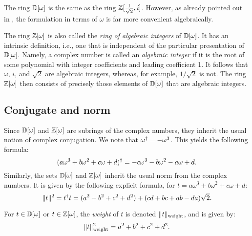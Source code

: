 \begin{remark}
  The ring $\mathbb{D}[\omega]$ is the same as the ring $\mathbb{Z}[\frac1{\sqrt{2}},i]$. However, as already pointed out
  in {\cite{Kliuchnikov-et-al}}, the formulation in terms of $\omega$ is far more convenient
  algebraically.
\end{remark}

\begin{remark}
  The ring $\mathbb{Z}[\omega]$ is also called the {\em ring of algebraic integers} of $\mathbb{D}[\omega]$. It has an intrinsic
  definition, i.e., one that is independent of the particular presentation of $\mathbb{D}[\omega]$. Namely, a
  complex number is called an {\em algebraic integer} if it is the root of some polynomial with
  integer coefficients and leading coefficient 1. It follows that $\omega$, $i$, and $\sqrt{2}$ are
  algebraic integers, whereas, for example, $1/\sqrt{2}$ is not. The ring $\mathbb{Z}[\omega]$ then consists of
  precisely those elements of $\mathbb{D}[\omega]$ that are algebraic integers.
\end{remark}

\subsection{Conjugate and norm} %
\label{sub:conjugate_and_norm}
\begin{remark}
  Since $\mathbb{D}[\omega]$ and $\mathbb{Z}[\omega]$ are subrings of the complex numbers, they inherit the usual notion of
  complex conjugation. We note that $\omega^{\dagger} = -\omega^3$. This yields the following formula:
  \begin{equation}\label{eqn-adjoint}
    (a\omega^3+b\omega^2+c\omega+d)^{\dagger} = -c\omega^3-b\omega^2-a\omega+d.
  \end{equation}
  Similarly, the sets $\mathbb{D}[\omega]$ and $\mathbb{Z}[\omega]$ inherit the usual norm from the complex numbers. It is given
  by the following explicit formula, for $t=a\omega^3+b\omega^2+c\omega+d$:
  \begin{equation}\label{eqn-cplx-norm}
    \|t\|^2 = t^{\dagger} t = (a^2+b^2+c^2+d^2) + (cd+bc+ab-da) \sqrt{2}.
  \end{equation}
\end{remark}

\begin{definition}[Weight]
  For $t\in\mathbb{D}[\omega]$ or $t\in\mathbb{Z}[\omega]$, the {\em weight} of $t$ is denoted $\|t\|_{\rm weight}$, and is given by:
  \begin{equation}\label{eqn-weight}
    \|t\|_{\rm weight}^2 = a^2+b^2+c^2+d^2.
  \end{equation}
\end{definition}

